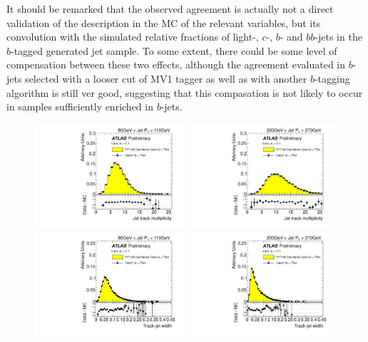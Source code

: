 It should be remarked that the observed agreement is actually not a direct validation of the description in the MC of the relevant variables, but its convolution with the simulated relative fractions of light-, $c$-, $b$- and $bb$-jets in the $b$-tagged generated jet sample. To some extent, there could be some level of compensation between these two effects, although the agreement evaluated in $b$-jets selected with a looser cut of MV1 tagger as well as with another $b$-tagging algorithm is still ver good, suggesting that this compasation is not likely to occur in samples sufficiently enriched in $b$-jets.


\begin{figure}[tp]
\centering
\includegraphics[width=0.49\textwidth]{FIGS/dataMC/FullDataVarNtrkPT080.pdf}
\includegraphics[width=0.49\textwidth]{FIGS/dataMC/FullDataVarNtrkPT200.pdf}
\includegraphics[width=0.49\textwidth]{FIGS/dataMC/FullDataVarTrkWidthPT080.pdf}
\includegraphics[width=0.49\textwidth]{FIGS/dataMC/FullDataVarTrkWidthPT200.pdf}  

\end{figure}

